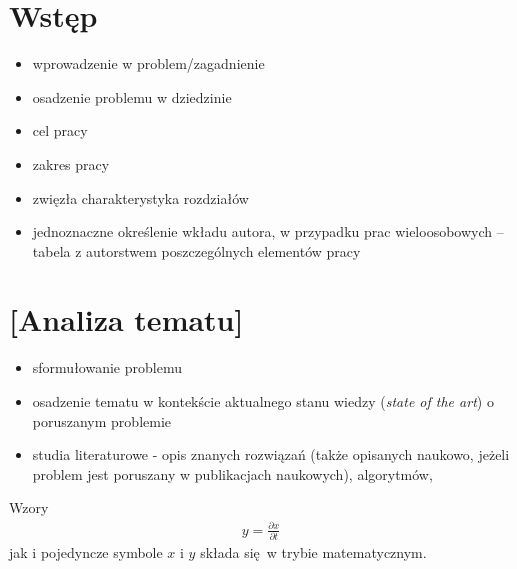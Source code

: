 \documentclass[a4paper,twoside,12pt]{book}
\newcommand{\obcy}[1]{\emph{#1}}
\newcommand{\ang}[1]{{\selectlanguage{british}\obcy{#1}}}
\newcounter{stronyPozaNumeracja}
\begin{document}
 

\thispagestyle{empty}
\tableofcontents
\thispagestyle{empty}

\setcounter{stronyPozaNumeracja}{\value{page}}
\mainmatter
\pagestyle{empty}
 
\cleardoublepage

\pagestyle{NumeryStronNazwyRozdzialow}


\chapter{Wstęp}

\begin{itemize}
\item wprowadzenie w problem/zagadnienie
\item osadzenie problemu w dziedzinie
\item cel pracy
\item zakres pracy
\item zwięzła charakterystyka rozdziałów
\item jednoznaczne określenie wkładu autora, w przypadku prac wieloosobowych – tabela z autorstwem poszczególnych elementów pracy
\end{itemize}

 


\chapter{[Analiza tematu]}

\begin{itemize}
\item sformułowanie problemu
\item osadzenie tematu w kontekście aktualnego stanu wiedzy (\ang{state of the art}) o poruszanym problemie
\item  studia literaturowe \cite{bib:artykul,bib:ksiazka,bib:konferencja,bib:internet} -  opis znanych rozwiązań (także opisanych naukowo, jeżeli problem jest poruszany w publikacjach naukowych), algorytmów, 
\end{itemize}


Wzory  
\begin{align}
y = \frac{\partial x}{\partial t}
\end{align}
jak i pojedyncze symbole $x$ i $y$  składa się w trybie matematycznym.
\end{document}
